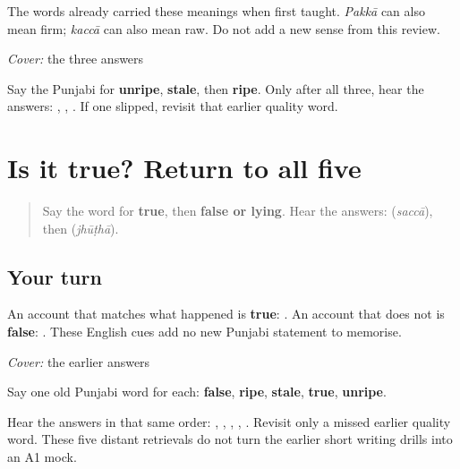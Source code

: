 The words already carried these meanings when first taught. \emph{Pakkā} can also mean firm; \emph{kaccā} can also mean raw. Do not add a new sense from this review.

\begin{tcolorbox}[breakable,colback=teal!4,colframe=teal!35!black,title={Before you move on}]
\emph{Cover:} the three answers

Say the Punjabi for \textbf{unripe}, \textbf{stale}, then \textbf{ripe}. Only after all three, hear the answers: \textbf{}, \textbf{}, \textbf{}. If one slipped, revisit that earlier quality word.
\end{tcolorbox}
\section[\texorpdfstring{\pa{ਸੱਚਾ} · \pa{ਝੂਠਾ} (saccā · jhūṭhā)}{ਸੱਚਾ · ਝੂਠਾ (saccā · jhūṭhā)}]{Is it true? Return to all five}

\label{lesson:PA-R158-truth-and-food-check}



\begin{quote}
Say the word for \textbf{true}, then \textbf{false or lying}. Hear the answers: \textbf{} (\emph{saccā}), then \textbf{} (\emph{jhūṭhā}).
\end{quote}

\subsection*{Your turn}
An account that matches what happened is \textbf{true}: \textbf{}. An account that does not is \textbf{false}: \textbf{}. These English cues add no new Punjabi statement to memorise.

\begin{tcolorbox}[breakable,colback=teal!4,colframe=teal!35!black,title={Before you move on}]
\emph{Cover:} the earlier answers

Say one old Punjabi word for each: \textbf{false}, \textbf{ripe}, \textbf{stale}, \textbf{true}, \textbf{unripe}.

Hear the answers in that same order: \textbf{}, \textbf{}, \textbf{}, \textbf{}, \textbf{}. Revisit only a missed earlier quality word. These five distant retrievals do not turn the earlier short writing drills into an A1 mock.
\end{tcolorbox}
